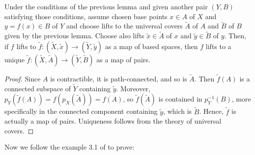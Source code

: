 \documentclass[TFM.tex]{subfiles}
\begin{document}
\begin{lemma}\label{lift}
Under the conditions of the previous lemma and given another pair $(Y,B)$ satisfying those conditions, assume chosen base points $x\in A$ of $X$ and $y=f(x)\in B$ of $Y$ and choose lifts to the universal covers $\widetilde{A}$ of $A$ and $\widetilde{B}$ of $B$ given by the previous lemma. Choose also lifts $\widetilde{x}\in\widetilde{A}$ of $x$ and $\widetilde{y}\in\widetilde{B}$ of $y$. Then, if $f$ lifts to $\widetilde{f}:(\widetilde{X},\widetilde{x})\to (\widetilde{Y},\widetilde{y})$ as a map of based spaces, then $f$ lifts to a unique $\widetilde{f}:(\widetilde{X},\widetilde{A})\to (\widetilde{Y},\widetilde{B})$ as a map of pairs. 
\end{lemma}
\begin{proof}
Since $A$ is contractible, it is path-connected, and so is $\widetilde{A}$. Then $\widetilde{f}(A)$ is a connected subspace of $\widetilde{Y}$ containing $\widetilde{y}$. Moreover, $p_Y(\widetilde{f}(A))=f(p_X(\widetilde{A}))=f(A)$, so $\widetilde{f}(\widetilde{A})$ is contained in $p_Y^{-1}(B)$, more specifically in the connected component containing $\widetilde{y}$, which is $\widetilde{B}$. Hence, $\widetilde{f}$ is actually a map of pairs. Uniqueness follows from the theory of universal covers.
\end{proof}

Now we follow the example 3.1 of \cite{bar} to prove:
\end{document}

